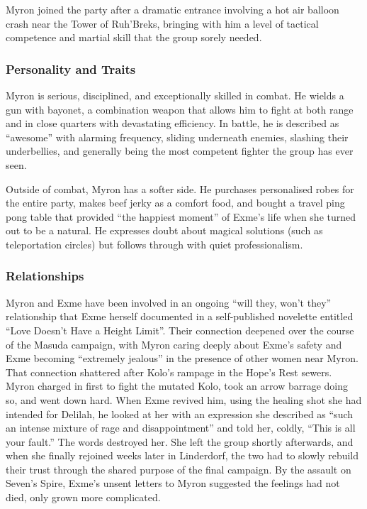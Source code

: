 Myron joined the party after a dramatic entrance involving a hot air balloon crash near the Tower of Ruh'Breks, bringing with him a level of tactical competence and martial skill that the group sorely needed.

\subsubsection{Personality and Traits}

Myron is serious, disciplined, and exceptionally skilled in combat.  He wields a gun with bayonet, a combination weapon that allows him to fight at both range and in close quarters with devastating efficiency.  In battle, he is described as ``awesome'' with alarming frequency, sliding underneath enemies, slashing their underbellies, and generally being the most competent fighter the group has ever seen.

Outside of combat, Myron has a softer side.  He purchases personalised robes for the entire party, makes beef jerky as a comfort food, and bought a travel ping pong table that provided ``the happiest moment'' of Exme's life when she turned out to be a natural.  He expresses doubt about magical solutions (such as teleportation circles) but follows through with quiet professionalism.

\subsubsection{Relationships}

Myron and Exme have been involved in an ongoing ``will they, won't they'' relationship that Exme herself documented in a self-published novelette entitled ``Love Doesn't Have a Height Limit''.  Their connection deepened over the course of the Masuda campaign, with Myron caring deeply about Exme's safety and Exme becoming ``extremely jealous'' in the presence of other women near Myron.  That connection shattered after Kolo's rampage in the Hope's Rest sewers.  Myron charged in first to fight the mutated Kolo, took an arrow barrage doing so, and went down hard.  When Exme revived him, using the healing shot she had intended for Delilah, he looked at her with an expression she described as ``such an intense mixture of rage and disappointment'' and told her, coldly, ``This is all your fault.''  The words destroyed her.  She left the group shortly afterwards, and when she finally rejoined weeks later in Linderdorf, the two had to slowly rebuild their trust through the shared purpose of the final campaign.  By the assault on Seven's Spire, Exme's unsent letters to Myron suggested the feelings had not died, only grown more complicated.

